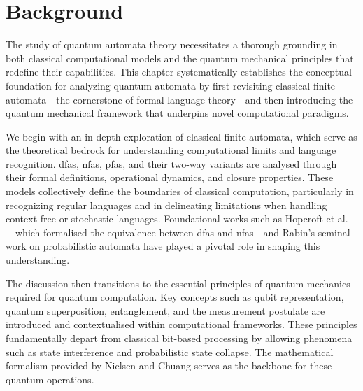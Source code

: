 \chapter{Background}  
\label{chap:background}

The study of quantum automata theory necessitates a thorough grounding in both classical computational models and the quantum mechanical principles that redefine their capabilities. This chapter systematically establishes the conceptual foundation for analyzing quantum automata by first revisiting classical finite automata—the cornerstone of formal language theory—and then introducing the quantum mechanical framework that underpins novel computational paradigms.

We begin with an in-depth exploration of classical finite automata, which serve as the theoretical bedrock for understanding computational limits and language recognition. \glspl{dfa}, \glspl{nfa}, \glspl{pfa}, and their two-way variants are analysed through their formal definitions, operational dynamics, and closure properties. These models collectively define the boundaries of classical computation, particularly in recognizing regular languages and in delineating limitations when handling context-free or stochastic languages. Foundational works such as Hopcroft et al. \cite{hopcroft2006introduction, sipser2012introduction}—which formalised the equivalence between \glspl{dfa} and \glspl{nfa}—and Rabin's seminal work on probabilistic automata \cite{rabin1963probabilistic} have played a pivotal role in shaping this understanding.

The discussion then transitions to the essential principles of quantum mechanics required for quantum computation. Key concepts such as qubit representation, quantum superposition, entanglement, and the measurement postulate are introduced and contextualised within computational frameworks. These principles fundamentally depart from classical bit-based processing by allowing phenomena such as state interference and probabilistic state collapse. The mathematical formalism provided by Nielsen and Chuang \cite{nielsen2010quantum} serves as the backbone for these quantum operations.




